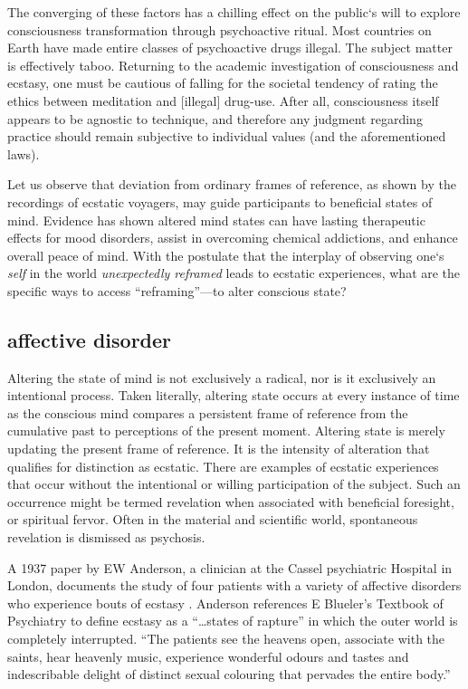 \documentclass{UIdahoMastersThesis}
\begin{document}
The converging of these factors has a chilling effect on the public`s will to explore consciousness transformation through psychoactive ritual. Most countries on Earth have made entire classes of psychoactive drugs illegal. The subject matter is effectively taboo. Returning to the academic investigation of consciousness and ecstasy, one must be cautious of falling for the societal tendency of rating the ethics between meditation and [illegal] drug-use. After all, consciousness itself appears to be agnostic to technique, and therefore any judgment regarding practice should remain subjective to individual values (and the aforementioned laws).

Let us observe that deviation from ordinary frames of reference, as shown by the recordings of ecstatic voyagers, may guide participants to beneficial states of mind. Evidence has shown altered mind states can have lasting therapeutic effects for mood disorders, assist in overcoming chemical addictions, and enhance overall peace of mind. With the postulate that the interplay of observing one`s \emph{self} in the world \emph{unexpectedly reframed} leads to ecstatic experiences, what are the specific ways to access ``reframing''---to alter conscious state?

\subsection{affective disorder}

Altering the state of mind is not exclusively a radical, nor is it exclusively an intentional process. Taken literally, altering state occurs at every instance of time as the conscious mind compares a persistent frame of reference from the cumulative past to perceptions of the present moment. Altering state is merely updating the present frame of reference. It is the intensity of alteration that qualifies for distinction as ecstatic. There are examples of ecstatic experiences that occur without the intentional or willing participation of the subject. Such an occurrence might be termed revelation when associated with beneficial foresight, or spiritual fervor. Often in the material and scientific world, spontaneous revelation is dismissed as psychosis.

A 1937 paper by EW Anderson, a clinician at the Cassel psychiatric Hospital in London, documents the study of four patients with a variety of affective disorders who experience bouts of ecstasy \cite{anderson_clinical_1938}. Anderson references E Blueler's Textbook of Psychiatry to define ecstasy as a ``\ldots states of rapture'' in which the outer world is completely interrupted. \enquote{The patients see the heavens open, associate with the saints, hear heavenly music, experience wonderful odours and tastes and indescribable delight of distinct sexual colouring that pervades the entire body.} 
\end{document}
